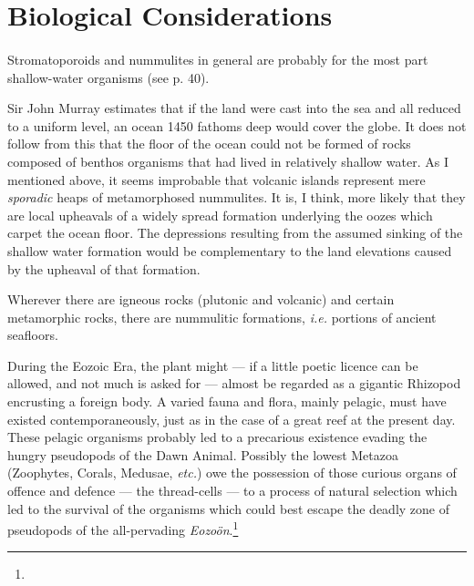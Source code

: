 \documentclass[a4paper, 12pt, oneside]{article}
\begin{document}
\section{Biological Considerations}
\paragraph{}
Stromatoporoids and nummulites in general are probably for the most part shallow-water organisms (see p. 40).

Sir John Murray estimates that if the land were cast into the sea and all reduced to a uniform level, an ocean 1450 fathoms deep would cover the globe. It does not follow from this that the floor of the ocean could not be formed of rocks composed of benthos organisms that had lived in relatively shallow water. As I mentioned above, it seems improbable that volcanic islands represent mere \emph{sporadic} heaps of metamorphosed nummulites. It is, I think, more likely that they are local upheavals of a widely spread formation underlying the oozes which carpet the ocean floor. The depressions resulting from the assumed sinking of the shallow water formation would be complementary to the land elevations caused by the upheaval of that formation.

Wherever there are igneous rocks (plutonic and volcanic) and certain metamorphic rocks, there are nummulitic formations, \emph{i.e.} portions of ancient seafloors.

During the Eozoic Era, the plant might --- if a little poetic licence can be allowed, and not much is asked for --- almost be regarded as a gigantic Rhizopod encrusting a foreign body. A varied fauna and flora, mainly pelagic, must have existed contemporaneously, just as in the case of a great reef at the present day. These pelagic organisms probably led to a precarious existence evading the hungry pseudopods of the Dawn Animal. Possibly the lowest Metazoa (Zoophytes, Corals, Medusae, \emph{etc.}) owe the possession of those curious organs of offence and defence --- the thread-cells --- to a process of natural selection which led to the survival of the organisms which could best escape the deadly zone of pseudopods of the all-pervading \emph{Eozoön}.\footnote{}
\end{document}

